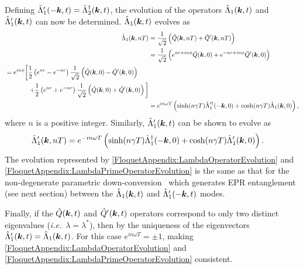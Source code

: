 Defining $\hat{\Lambda}_1'(-\bm{k}, t) = \hat{\Lambda}_2^\dagger(\bm{k}, t)$, the evolution of the operators $\hat{\Lambda}_1(\bm{k}, t)$ and $\hat{\Lambda}_1'(\bm{k}, t)$ can now be determined. $\hat{\Lambda}_1(\bm{k}, t)$ evolves as
\begin{align}
    \hat{\Lambda}_1(\vect{k}, nT) &= \frac{1}{\sqrt{2}} \left(\hat{Q}(\vect{k}, nT) + \hat{Q}'(\vect{k}, nT) \right) \\
        &= \frac{1}{\sqrt{2}} \left( e^{nr + i n\phi} \hat{Q}(\vect{k}, 0) + e^{-nr + i n \phi}\hat{Q}'(\vect{k}, 0)\right) \\
        \begin{split}
            &=  e^{i n \phi} \bigg[ \frac{1}{2}\left( e^{nr} - e^{-nr}\right)\frac{1}{\sqrt{2}}\left(\hat{Q}(\vect{k}, 0) - \hat{Q}'(\vect{k}, 0) \right) \\
            &\relphantom{=e^{i n \phi}\bigg[} + \frac{1}{2} \left( e^{nr} + e^{-nr}\right)\frac{1}{\sqrt{2}} \left( \hat{Q}(\vect{k}, 0) + \hat{Q}'(\vect{k}, 0)\right)\bigg]
        \end{split}\\
        &= e^{i n \omega T} \left( \sinh(n\gamma T) \hat{\Lambda}_1'^\dagger(-\vect{k}, 0) + \cosh(n \gamma T) \hat{\Lambda}_1(\vect{k}, 0)\right), \label{FloquetAppendix:LambdaOperatorEvolution}
\end{align}
where $n$ is a positive integer. Similarly, $\hat{\Lambda}_1'(\bm{k}, t)$ can be shown to evolve as
\begin{align}
    \hat{\Lambda}_1'(\vect{k}, nT) &= e^{-i n \omega T} \left( \sinh(n \gamma T) \hat{\Lambda}_1^\dagger(-\vect{k}, 0) + \cosh(n \gamma T) \hat{\Lambda}_1'(\vect{k}, 0)\right). \label{FloquetAppendix:LambdaPrimeOperatorEvolution}
\end{align}
The evolution represented by \eqref{FloquetAppendix:LambdaOperatorEvolution} and \eqref{FloquetAppendix:LambdaPrimeOperatorEvolution} is the same as that for the non-degenerate parametric down-conversion~\citep{WallsMilburn} which generates EPR entanglement (see next section) between the $\hat{\Lambda}_1(\bm{k}, t)$ and $\hat{\Lambda}_1'(-\bm{k}, t)$ modes.

Finally, if the $\hat{Q}(\bm{k}, t)$ and $\hat{Q}'(\bm{k}, t)$ operators correspond to only two distinct eigenvalues (\emph{i.e.}\  $\lambda = \lambda^*$), then by the uniqueness of the eigenvectors $\hat{\Lambda}_1'(\bm{k}, t) = \hat{\Lambda}_1(\bm{k}, t)$. For this case $\displaystyle e^{i n\omega T} = \pm 1$, making \eqref{FloquetAppendix:LambdaOperatorEvolution} and \eqref{FloquetAppendix:LambdaPrimeOperatorEvolution} consistent.

